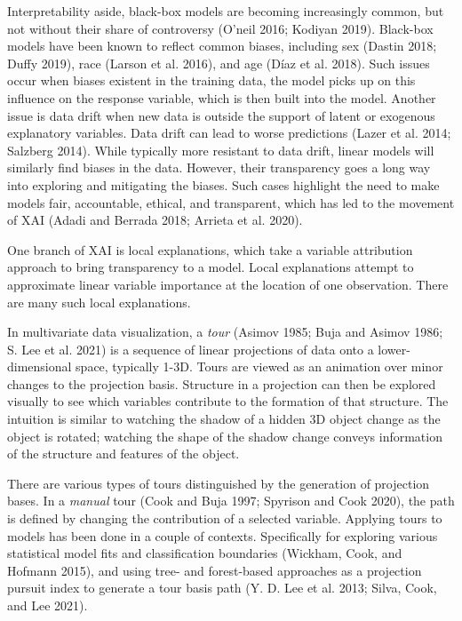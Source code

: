 \documentclass[
  article]{article}
\begin{document}
Interpretability aside, black-box models are becoming increasingly common, but not without their share of controversy (O'neil 2016; Kodiyan 2019). Black-box models have been known to reflect common biases, including sex (Dastin 2018; Duffy 2019), race (Larson et al. 2016), and age (Díaz et al. 2018). Such issues occur when biases existent in the training data, the model picks up on this influence on the response variable, which is then built into the model. Another issue is data drift when new data is outside the support of latent or exogenous explanatory variables. Data drift can lead to worse predictions (Lazer et al. 2014; Salzberg 2014). While typically more resistant to data drift, linear models will similarly find biases in the data. However, their transparency goes a long way into exploring and mitigating the biases. Such cases highlight the need to make models fair, accountable, ethical, and transparent, which has led to the movement of XAI (Adadi and Berrada 2018; Arrieta et al. 2020).

One branch of XAI is local explanations, which take a variable attribution approach to bring transparency to a model. Local explanations attempt to approximate linear variable importance at the location of one observation. There are many such local explanations.

In multivariate data visualization, a \emph{tour} (Asimov 1985; Buja and Asimov 1986; S. Lee et al. 2021) is a sequence of linear projections of data onto a lower-dimensional space, typically 1-3D. Tours are viewed as an animation over minor changes to the projection basis. Structure in a projection can then be explored visually to see which variables contribute to the formation of that structure. The intuition is similar to watching the shadow of a hidden 3D object change as the object is rotated; watching the shape of the shadow change conveys information of the structure and features of the object.

There are various types of tours distinguished by the generation of projection bases. In a \emph{manual} tour (Cook and Buja 1997; Spyrison and Cook 2020), the path is defined by changing the contribution of a selected variable. Applying tours to models has been done in a couple of contexts. Specifically for exploring various statistical model fits and classification boundaries (Wickham, Cook, and Hofmann 2015), and using tree- and forest-based approaches as a projection pursuit index to generate a tour basis path (Y. D. Lee et al. 2013; Silva, Cook, and Lee 2021).
\end{document}
